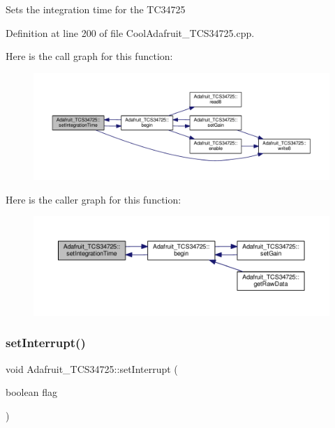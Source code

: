Sets the integration time for the T\+C34725 

Definition at line 200 of file Cool\+Adafruit\+\_\+\+T\+C\+S34725.\+cpp.

Here is the call graph for this function\+:\nopagebreak
\begin{figure}[H]
\begin{center}
\leavevmode
\includegraphics[width=350pt]{class_adafruit___t_c_s34725_a3c89fe5d4eea1f24f31d1afa9de8f0f3_cgraph}
\end{center}
\end{figure}
Here is the caller graph for this function\+:\nopagebreak
\begin{figure}[H]
\begin{center}
\leavevmode
\includegraphics[width=350pt]{class_adafruit___t_c_s34725_a3c89fe5d4eea1f24f31d1afa9de8f0f3_icgraph}
\end{center}
\end{figure}
\mbox{\label{class_adafruit___t_c_s34725_ae477b116ac93cf075be20637207aee57}} 
\subsubsection{\texorpdfstring{set\+Interrupt()}{setInterrupt()}}
{\footnotesize\ttfamily void Adafruit\+\_\+\+T\+C\+S34725\+::set\+Interrupt (\begin{DoxyParamCaption}\item[{boolean}]{flag }\end{DoxyParamCaption})}



